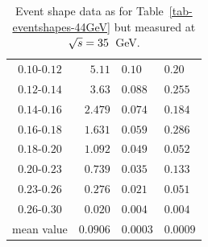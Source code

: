 \documentclass[12pt,a4paper,twoside]{article}
\begin{document}
\begin{table}[!htb]
\begin{center}
\begin{tabular}{|c||r@{ $\pm$ }l@{ $\pm$ }l|}
$ 0.10 $-$0.12  $&$  5.11  $&$  0.10  $&$  0.20  $\\
$ 0.12 $-$0.14  $&$  3.63  $&$  0.088 $&$  0.255 $\\
$ 0.14 $-$0.16  $&$  2.479 $&$  0.074 $&$  0.184 $\\
$ 0.16 $-$0.18  $&$  1.631 $&$  0.059 $&$  0.286 $\\
$ 0.18 $-$0.20  $&$  1.092 $&$  0.049 $&$  0.052 $\\
$ 0.20 $-$0.23  $&$  0.739 $&$  0.035 $&$  0.133 $\\
$ 0.23 $-$0.26  $&$  0.276 $&$  0.021 $&$  0.051 $\\
$ 0.26 $-$0.30  $&$  0.020 $&$  0.004 $&$  0.004 $\\
\hline\hline
mean value       &$  0.0906 $&$ 0.0003 $&$ 0.0009 $\\
\hline
\end{tabular}

\end{center}
\caption[dummy]{\label{tab-eventshapes-35GeV}
Event shape data as for Table~\protect\ref{tab-eventshapes-44GeV}
but measured at $\protect\sqrt{s}=35$~GeV.
}
\end{table}

\newpage
\end{document}
